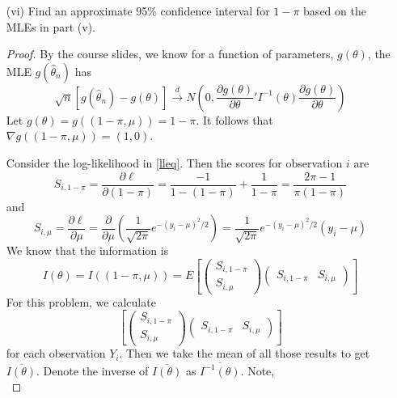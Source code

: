 \documentclass[letterpaper, 12pt]{article}
\begin{document}
\begin{enumerate}
\begin{enumerate}
\item[(vi)]
Find an approximate 95\% confidence interval for $1-\pi$ based on the MLEs
in part (v). 
\begin{proof}
By the course slides, we know for a function of parameters, $g(\theta)$, the
MLE $g(\hat{\theta}_n)$ has
\begin{equation}
\sqrt{n}[g(\hat{\theta}_n) - g(\theta)] \xrightarrow{d} 
N
\left(
0, \frac{\partial g(\theta) }{\partial \theta}' I^{-1}(\theta) \frac{\partial g(\theta) }{\partial \theta}
\right)
\end{equation}
Let $g(\theta) = g((1-\pi,\mu)) = 1 - \pi$. It follows that $\nabla g((1-\pi,\mu)) = (1,0)$.


Consider the log-likelihood in \eqref{lleq}. Then the scores for observation $i$ are 
\begin{equation}
\label{scorepi}
S_{i,1-\pi} = 
\frac{\partial \ell}{\partial (1-\pi)} = \frac{-1}{1-(1-\pi)} + \frac{1}{1-\pi} = \frac{2\pi -1}{\pi (1-\pi)}
\end{equation}
and
\begin{equation}
S_{i,\mu} =
\frac{\partial \ell}{\partial \mu} = 
\frac{\partial}{\partial \mu} \left(  
\frac{1}{\sqrt{2\pi}}
e^{-(y_i - \mu)^2/2}
\right)
=\frac{1}{\sqrt{2\pi}} e^{-(y_i - \mu)^2/2} (y_i - \mu)
\end{equation}
We know that the information is
\begin{equation}
\label{info}
I(\theta) = I((1-\pi,\mu)) = E \left[
\begin{pmatrix}
S_{i,1-\pi} \\
S_{i,\mu}
\end{pmatrix}
\begin{pmatrix}
S_{i, 1 - \pi} & S_{i, \mu}
\end{pmatrix}
\right]
\end{equation}
For this problem, we calculate
\begin{equation}
\label{indsc}
\left[
\begin{pmatrix}
S_{i,1-\pi} \\
S_{i,\mu}
\end{pmatrix}
\begin{pmatrix}
S_{i, 1 - \pi} & S_{i, \mu}
\end{pmatrix}
\right]
\end{equation}
for each observation $Y_i$. Then we take the mean of all those results to get $\overline{I(\theta)}$. Denote the inverse of $\overline{I(\theta)}$ as $\overline{I^{-1}(\theta)}$. Note, 
\begin{equation}

\end{equation}
\end{proof}
\end{enumerate}
\end{enumerate}
\end{document}
